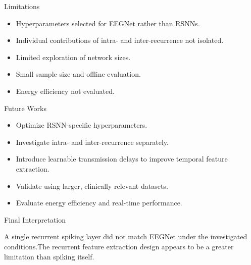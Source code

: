 \documentclass[aspectratio=169]{beamer}
\begin{document}

\begin{frame}{Limitations}
    \small
    \begin{itemize}
                    \item Hyperparameters selected for EEGNet rather than RSNNs.
                    \item Individual contributions of intra- and inter-recurrence not isolated.
                    \item Limited exploration of network sizes.
                    \item Small sample size and offline evaluation.
                    \item Energy efficiency not evaluated.
                \end{itemize}
\end{frame}


\begin{frame}{Future Works}
    \small
    \begin{itemize}
                    \item Optimize RSNN-specific hyperparameters.
                    \item Investigate intra- and inter-recurrence separately.
                    \item Introduce learnable transmission delays to improve temporal feature extraction.
                    \item Validate using larger, clinically relevant datasets.
                    \item Evaluate energy efficiency and real-time performance.
                \end{itemize}
\end{frame}


\begin{frame}{Final Interpretation }

\Large
\centering
A single recurrent spiking layer did not match EEGNet under the investigated conditions.The recurrent feature extraction design appears to be a greater limitation than spiking itself.

\end{frame}
\end{document}
